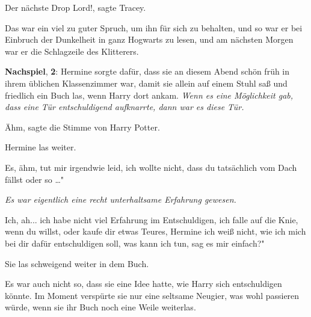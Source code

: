 \glqq Der nächste Drop Lord!\grqq{}, sagte Tracey.

Das war ein viel zu guter Spruch, um ihn für sich zu behalten, und so war er bei
Einbruch der Dunkelheit in ganz Hogwarts zu lesen, und am nächsten Morgen war er
die Schlagzeile des Klitterers.

\textbf{Nachspiel}, \textbf{2}: Hermine sorgte dafür, dass sie an diesem Abend
schön früh in ihrem üblichen Klassenzimmer war, damit sie allein auf einem Stuhl
saß und friedlich ein Buch las, wenn Harry dort ankam.
\emph{ Wenn es eine Möglichkeit gab, dass eine Tür entschuldigend aufknarrte, dann war es diese Tür.}

\glqq Ähm\grqq{}, sagte die Stimme von Harry Potter.

Hermine las weiter.

\glqq Es, ähm, tut mir irgendwie leid, ich wollte nicht, dass du tatsächlich vom
Dach fällst oder so …"

\emph{ Es war eigentlich eine recht unterhaltsame Erfahrung gewesen.}

\glqq Ich, ah... ich habe nicht viel Erfahrung im Entschuldigen, ich falle auf
die Knie, wenn du willst, oder kaufe dir etwas Teures, Hermine ich weiß nicht,
wie ich mich bei dir dafür entschuldigen soll, was kann ich tun, sag es mir
einfach?"

Sie las schweigend weiter in dem Buch.

Es war auch nicht so, dass sie eine Idee hatte, wie Harry sich entschuldigen
könnte. Im Moment verspürte sie nur eine seltsame Neugier, was wohl passieren
würde, wenn sie ihr Buch noch eine Weile weiterlas.

